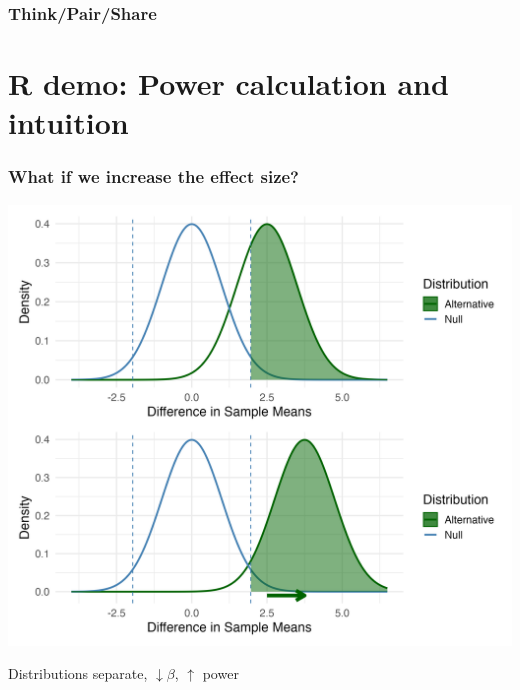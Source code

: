 \documentclass[slidestop,compress,mathserif]{beamer}
\begin{document}
\begin{frame}
\begin{columns}[T]
\begin{column}{0.5\textwidth}
    \end{column}
  \end{columns}
\end{frame}


\begin{frame}
\frametitle{Think/Pair/Share}
\end{frame}


\section{R demo: Power calculation and intuition}


\begin{frame}
\frametitle{What if we increase the effect size?}
  \begin{center}
      \includegraphics[height=0.75\textheight]{figures/whatif_baseline_effect.png}
  \end{center}
  Distributions separate, $\downarrow\beta$, $\uparrow$ power
\end{frame}

\end{document}
